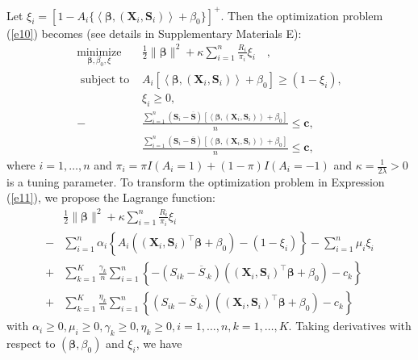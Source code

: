 \documentclass[12pt]{article}
\theoremstyle{plain}
\theoremstyle{definition}
\theoremstyle{remark}
\begin{document}
Let $\xi_i=\left[1- A_i\{\left\langle\boldsymbol{\beta},(\boldsymbol{X}_i, \boldsymbol{S}_i) \right\rangle+{\beta}_0\}\right]^{+}$. Then the optimization problem (\ref{e10}) becomes (see details in Supplementary Materials E):
\begin{equation}
\label{e11}
\begin{aligned}
\underset{\boldsymbol{\beta}, {\beta}_0,\xi}{\operatorname{minimize}}\quad&\frac{1}{2}\|\boldsymbol{\beta}\|^2+\kappa \sum_{i=1}^n \frac{R_i}{\pi_i} \xi_i \quad, \\
\text { subject to } & A_i[\left\langle\boldsymbol{\beta},(\boldsymbol{X}_i, \boldsymbol{S}_i) \right\rangle+{\beta}_0]\geq \left(1-\xi_i\right),\\
&\xi_i \geq 0,\\
-&\frac{\sum_{i=1}^n(\boldsymbol{S}_{i}-\overline{\boldsymbol{S}})[\left\langle\boldsymbol{\beta}, (\boldsymbol{X}_i, \boldsymbol{S}_i) \right\rangle+{\beta}_0]}{n} \leq \boldsymbol{c},\\
&\frac{\sum_{i=1}^n(\boldsymbol{S}_{i}-\overline{\boldsymbol{S}})[\left\langle\boldsymbol{\beta},(\boldsymbol{X}_i, \boldsymbol{S}_i) \right\rangle+{\beta}_0]}{n} \leq  \boldsymbol{c},
\end{aligned}
\end{equation}
where $i=1,\ldots, n$ and  $\pi_i=\pi I\left(A_i=1\right)+(1-\pi) I\left(A_i=-1\right)$ and $\kappa=\frac{1}{2\lambda}>0$ is a tuning parameter.
To transform the optimization problem in Expression (\ref{e11}), we propose the Lagrange function:
\begin{equation}
\label{e12}
\begin{aligned}
& \frac{1}{2}\|\boldsymbol{\beta}\|^2+\kappa \sum_{i=1}^n \frac{R_i}{\pi_i} \xi_i \\
-&\sum_{i=1}^n \alpha_i\left\{A_i\left((\boldsymbol{X}_i,\boldsymbol{S}_i)^\top \boldsymbol{\beta}+\beta_0\right)-\left(1-\xi_i\right)\right\}-\sum_{i=1}^n \mu_i \xi_i\\
+&\sum_{k=1}^K\frac{\gamma_k }{n}\sum_{i=1}^n\left\{-({S}_{ik}-\overline{S}_{\cdot k})\left((\boldsymbol{X}_i,\boldsymbol{S}_i)^\top \boldsymbol{\beta}+\beta_0\right) - c_k \right\}\\
+&\sum_{k=1}^K\frac{\eta_k }{n}\sum_{i=1}^n\left\{({S}_{ik}-\overline{S}_{\cdot k})\left((\boldsymbol{X}_i,\boldsymbol{S}_i)^\top \boldsymbol{\beta}+\beta_0\right) - c_k \right\}
\nonumber
\end{aligned}
\end{equation}
with $\alpha_i \geq 0, \mu_i \geq 0, \gamma_k\geq 0,\eta_k\geq 0,  i=1,\ldots, n, k=1,\ldots,K$. Taking derivatives with respect to $\left(\boldsymbol{\beta}, \beta_0\right)$ and $\xi_i$, we have
\end{document}
